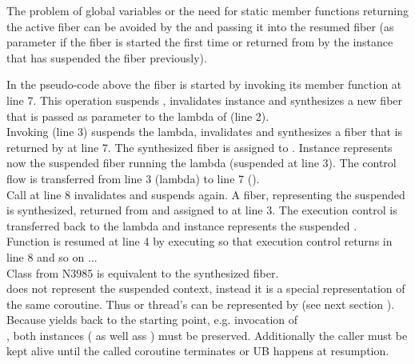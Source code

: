 \label{solution_gpub}


\label{synthesizing}
The problem of global variables or the need for static member functions
returning the active fiber can be avoided by  the
 and passing it into the resumed fiber (as parameter if the
fiber is started the first time or returned from \resume by the instance that
has suspended the fiber previously).

In the pseudo-code above the fiber  is started by invoking its member
function \resume at line 7. This operation suspends , invalidates
instance  and synthesizes a new fiber  that is passed as parameter
to the lambda of  (line 2).\\
Invoking  (line 3) suspends the lambda, invalidates  and
synthesizes a fiber that is returned by  at line 7. The
synthesized fiber is assigned to . Instance  represents now the
suspended fiber running the lambda (suspended at line 3). The control flow is
transferred from line 3 (lambda) to line 7 ().\\
Call  at line 8 invalidates  and suspends 
again. A fiber, representing the suspended  is synthesized, returned
from  and assigned to  at line 3. The execution control
is transferred back to the lambda and instance  represents the suspended
.\\
Function  is resumed at line 4 by executing  so that
execution control returns in line 8 and so on ...\\

Class  from  N3985\cite{N3985} is
 equivalent to the synthesized fiber.\\
 does not represent the suspended context,
instead it is a special representation of the same coroutine. Thus \main or
thread's \entryfn\xspace can  be represented by 
(see next section ).\\
Because  yields back to the starting
point, e.g. invocation of\\
,
both instances ( as well ass ) must be preserved.
Additionally the caller must be kept alive until the called coroutine terminates
or UB happens at resumption.\\

